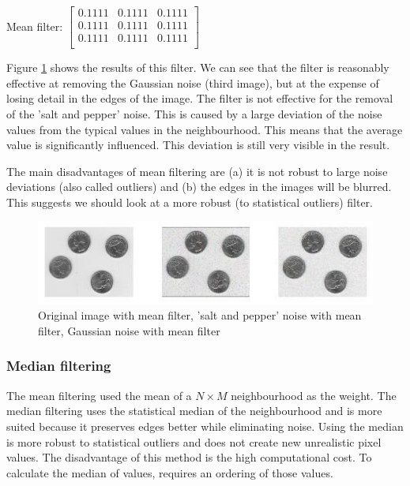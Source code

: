 \documentclass[12pt]{article}
\begin{document}
Mean filter:
$\begin{bmatrix}
	0.1111 & 0.1111 & 0.1111 \\
	0.1111 & 0.1111 & 0.1111 \\
	0.1111 & 0.1111 & 0.1111 \\
\end{bmatrix}$
\newline
\newline

Figure \ref{noise_mean} shows the results of this filter. We can see that the filter is reasonably effective at removing the Gaussian noise (third image), but at the expense of losing detail in the edges of the image. The filter is not effective for the removal of the 'salt and pepper' noise. This is caused by a large deviation of the noise values from the typical values in the neighbourhood. This means that the average value is significantly influenced. This deviation is still very visible in the result.
\newline

The main disadvantages of mean filtering are (a) it is not robust to large noise deviations (also called outliers) and (b) the edges in the images will be blurred. This suggests we should look at a more robust (to statistical outliers) filter.

\begin{figure}[h]
\hspace*{-2cm}
\centering
\includegraphics[scale = 1.2]{img/noise_mean}
\caption{Original image with mean filter, 'salt and pepper' noise with mean filter, Gaussian noise with mean filter}
\label{noise_mean}
\end{figure}

\subsubsection{Median filtering}

The mean filtering used the mean of a $N \times M$ neighbourhood as the weight. The median filtering uses the statistical median of the neighbourhood and is more suited because it preserves edges better while eliminating noise. Using the median is more robust to statistical outliers and does not create new unrealistic pixel values.
The disadvantage of this method is the high computational cost. To calculate the median of values, requires an ordering of those values.
\newline
\end{document}
